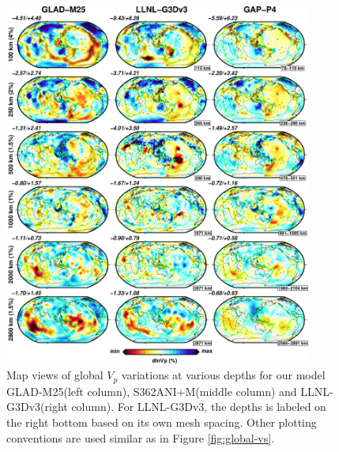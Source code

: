 \documentclass[extra,mreferee]{gji}
\begin{document}
\begin{figure}
\includegraphics[width=0.9\textwidth]{figures/depth_slice/globe_vp_LLNL-GAP.pdf}
  \caption{Map views of global $V_p$ variations at various depths for our model GLAD-M25(left column), S362ANI+M(middle column) and LLNL-G3Dv3(right column)\citep{simmons2012llnl}. For LLNL-G3Dv3, the depths is labeled on the right bottom based on its own mesh spacing. Other plotting conventions are used similar as in Figure \ref{fig:global-vs}.}
\label{fig:global-vp}
\centering
\end{figure}
\end{document}
